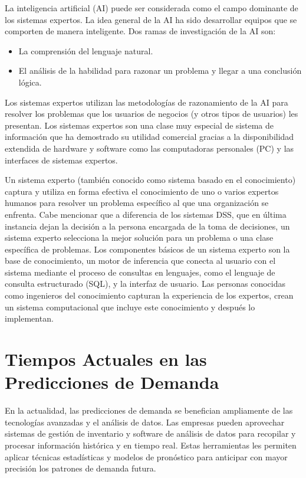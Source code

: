 La inteligencia artificial (AI) puede ser considerada como el campo dominante de los sistemas expertos. La idea general de la AI ha sido desarrollar equipos que se comporten de manera inteligente. Dos ramas de investigación de la AI son: 

\begin{itemize}

\item La comprensión del lenguaje natural. 
\item El análisis de la habilidad para razonar un problema y llegar a una conclusión lógica. 

\end{itemize}

Los sistemas expertos utilizan las metodologías de razonamiento de la AI para resolver los problemas que los usuarios de negocios (y otros tipos de usuarios) les presentan. Los sistemas expertos son una clase muy especial de sistema de información que ha demostrado su utilidad comercial gracias a la disponibilidad extendida de hardware y software como las computadoras personales (PC) y las interfaces de sistemas expertos.


Un sistema experto (también conocido como sistema basado en el conocimiento) captura y utiliza en forma efectiva el conocimiento de uno o varios expertos humanos para resolver un problema específico al que una organización se enfrenta. Cabe mencionar que a diferencia de los sistemas DSS, que en última instancia dejan la decisión a la persona encargada de la toma de decisiones, un sistema experto selecciona la mejor solución para un problema o una clase específica de problemas. Los componentes básicos de un sistema experto son la base de conocimiento, un motor de inferencia que conecta al usuario con el sistema mediante el proceso de consultas en lenguajes, como el lenguaje de consulta estructurado (SQL), y la interfaz de usuario. Las personas conocidas como ingenieros del conocimiento capturan la experiencia de los expertos, crean un sistema computacional que incluye este conocimiento y después lo implementan.

\section{Tiempos Actuales en las Predicciones de Demanda}

En la actualidad, las predicciones de demanda se benefician ampliamente de las tecnologías avanzadas y el análisis de datos. Las empresas pueden aprovechar sistemas de gestión de inventario y software de análisis de datos para recopilar y procesar información histórica y en tiempo real. Estas herramientas les permiten aplicar técnicas estadísticas y modelos de pronóstico para anticipar con mayor precisión los patrones de demanda futura.

